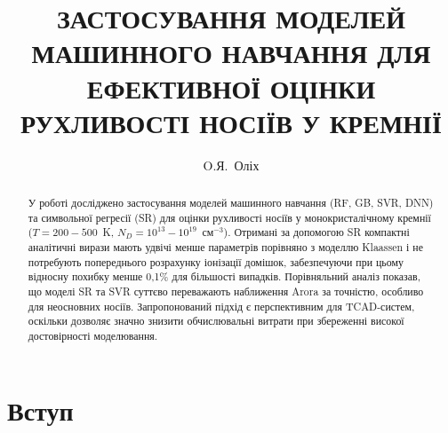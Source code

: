 \documentclass[fleqn,twoside,twocolumn,nofootinbib,showkeys]{revtex4} %
\begin{document}
\title[Застосування моделей машинного навчання для оцінки рухливості носіїв у Si]%
{ЗАСТОСУВАННЯ МОДЕЛЕЙ МАШИННОГО НАВЧАННЯ ДЛЯ ЕФЕКТИВНОЇ ОЦІНКИ РУХЛИВОСТІ НОСІЇВ У КРЕМНІЇ}
\author{O.Я.~Оліх}%
\address{Україна, 01601, місто Київ, вул. Володимирська, 64/13}%

  \razd{\secvii}



\setcounter{page}{1}

\begin{abstract}
У роботі досліджено застосування моделей машинного навчання (RF, GB, SVR, DNN) 
та символьної регресії (SR) для оцінки рухливості носіїв у монокристалічному кремнії
($T=200-500$~K, $N_D=10^{13}-10^{19}$~см$^{-3}$). 
Отримані за допомогою SR компактні аналітичні вирази мають удвічі менше параметрів порівняно 
з моделлю Klaassen і не потребують попереднього розрахунку іонізації домішок, 
забезпечуючи при цьому відносну похибку менше 0,1\% для більшості випадків.
Порівняльний аналіз показав, що моделі SR та SVR суттєво переважають наближення Arora за точністю, 
особливо для неосновних носіїв. 
Запропонований підхід є перспективним для TCAD-систем, оскільки дозволяє значно знизити обчислювальні 
витрати при збереженні високої достовірності моделювання.
\end{abstract}


\maketitle

\section{Вступ}\label{Vstup}
\end{document}
